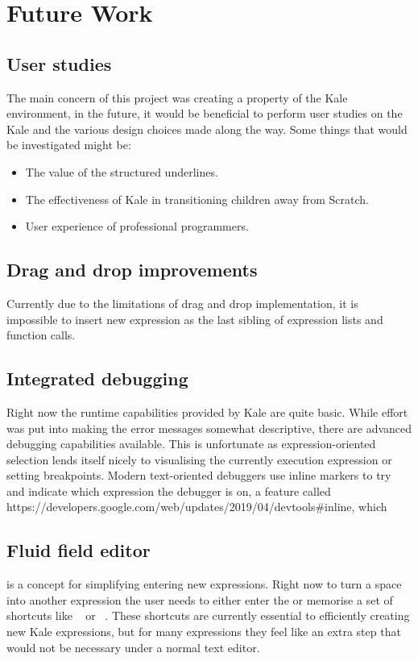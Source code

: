 \section{Future Work}

\subsection{User studies}
The main concern of this project was creating a property of the Kale
environment, in the future, it would be beneficial to perform user studies on
the Kale and the various design choices made along the way. Some things that
would be investigated might be:

\begin{itemize}[noitemsep]
	\item The value of the structured underlines.
	\item The effectiveness of Kale in transitioning children away from Scratch.
	\item User experience of professional programmers.
\end{itemize}

\subsection{Drag and drop improvements}
Currently due to the limitations of drag and drop implementation, it is
impossible to insert new expression as the last sibling of expression lists
and function calls.

\subsection{Integrated debugging}
Right now the runtime capabilities provided by Kale are quite basic. While
effort was put into making the error messages somewhat descriptive, there
are advanced debugging capabilities available. This is unfortunate as
expression-oriented selection lends itself nicely to visualising the currently
execution expression or setting breakpoints. Modern text-oriented debuggers use
inline markers to try and indicate which expression the debugger is on, a
feature called 
{https://developers.google.com/web/updates/2019/04/devtools\#inline}, which

\subsection{Fluid field editor}
 is a concept for simplifying entering new expressions. Right
now to turn a space into another expression the user needs to either enter the
\hyperref[soln:space_popover]{} or memorise a set of
shortcuts like
\hyperref[cmd:make_var]{}~ or
\hyperref[cmd:make_var]{}~.
These shortcuts are currently essential to efficiently creating new Kale
expressions, but for many expressions they feel like an extra step that would
not be necessary under a normal text editor.

